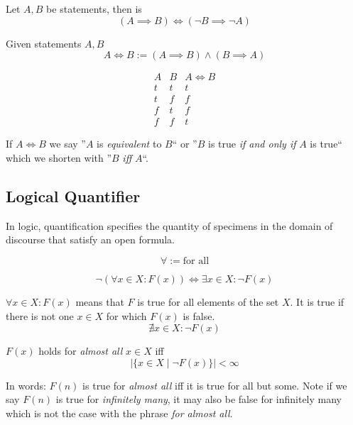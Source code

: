 \begin{proposition}[Contraposition]
   Let \(A, B\) be statements, then is
   \[(A \implies B) \iff (\neg B \implies \neg A)\]
\end{proposition}

\begin{definition}
   Given statements \(A, B\)
   \[A \iff B := (A \implies B) \land (B \implies A)\]

   \[\begin{array}{c|c||c}
         A & B & A \iff B \\
         \hline
         t & t & t \\
         t & f & f \\
         f & t & f \\
         f & f & t
   \end{array}\]
\end{definition}
\begin{remark}
   If \(A \iff B\) we say ''\(A\) is \textit{equivalent} to \(B\)`` or ''\(B\) is true \textit{if and only if} \(A\) is true`` which we shorten with ''\(B\) \textit{iff} \(A\)``.
\end{remark}

\subsection{Logical Quantifier}
In logic, quantification specifies the quantity of specimens in the domain of discourse that satisfy an open formula.

\begin{definition}
   \[\forall := \text{for all}\]
\end{definition}
\begin{remark}
   \[\neg(\forall x \in X: F(x)) \iff \exists x \in X: \neg F(x)\]
\end{remark}
\begin{example}
   \(\forall x \in X: F(x)\) means that \(F\) is true for all elements of the set \(X\).
   It is true if there is not one \(x \in X\) for which \(F(x)\) is false.
   \[\nexists x \in X: \neg F(x)\]
\end{example}

\begin{definition}
   \(F(x)\) holds for \emph{almost all} \(x \in X\) iff
   \[\Big|\big\{x \in X \mid \neg F(x)\big\}\Big| < \infty\]
\end{definition}
\begin{remark}
   In words: \(F(n)\) is true for \emph{almost all} iff it is true for all but some.
   Note if we say \(F(n)\) is true for \emph{infinitely many}, it may also be false for infinitely many which is not the case with the phrase \emph{for almost all}.
\end{remark}

